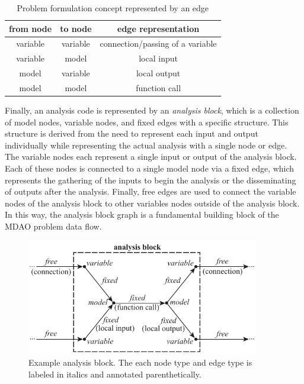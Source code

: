 \begin{table}[h!]
 \begin{center}
  \caption{Problem formulation concept represented by an edge}
  \label{t:edge representation}
  \begin{tabular}{ccc} \hline 
from node & to node & edge representation \\ \hline
variable & variable & connection/passing of a variable\\
variable & model & local input \\
model & variable & local output \\
model & model & function call \\ \hline
  \end{tabular}
 \end{center}
 \vspace{-15pt}
\end{table}

Finally, an analysis code is represented by an \emph{analysis block}, which is a collection of model nodes, variable nodes, and fixed edges with a specific structure. This structure is derived from the need to represent each input and output individually while representing the actual analysis with a single node or edge. The variable nodes each represent a single input or output of the analysis block. Each of these nodes is connected to a single model node via a fixed edge, which represents the gathering of the inputs to begin the analysis or the disseminating of outputs after the analysis. Finally, free edges are used to connect the variable nodes of the analysis block to other variables nodes outside of the analysis block. In this way, the analysis block graph is a fundamental building block of the MDAO problem data flow.
\begin{figure}[htb!]
	\begin{center}
	\includegraphics[width=4in]{images/analysis_block}
	\end{center}
	\vspace{-10pt}
\caption{Example analysis block. The each node type and edge type is labeled in italics and annotated parenthetically.}
\label{f:analysis block}
\end{figure}

